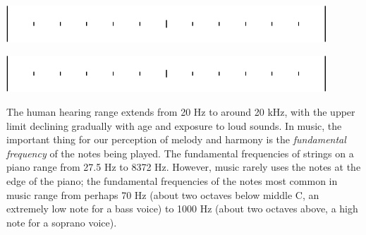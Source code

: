 \documentclass[12pt]{article}
\begin{document}
\vspace{0.5in}
\begin{minipage}{0.5\textwidth}
	\begin{center}
		\includegraphics[width=0.9\textwidth]{string-crop.pdf}
	\end{center}
\end{minipage}
\begin{minipage}{0.25\textwidth}
	\hspace{0.5in}
\end{minipage}
\begin{minipage}{0.25\textwidth}
	\begin{center}
		
	\end{center}	
\end{minipage}


\vspace{0.5in}
\begin{minipage}{0.5\textwidth}
	\begin{center}
		\includegraphics[width=0.9\textwidth]{string-crop.pdf}
	\end{center}
\end{minipage}
\begin{minipage}{0.25\textwidth}
	\hspace{0.5in}
\end{minipage}
\begin{minipage}{0.25\textwidth}
	\begin{center}
		
	\end{center}	
\end{minipage}

\newpage

The human hearing range extends from 20 Hz to around 20 kHz, with the upper limit declining gradually with age and exposure to loud sounds. In music, the important thing for our perception of melody and harmony is the {\it fundamental frequency} of the notes being played. The fundamental frequencies of strings on a piano range from 27.5 Hz to 8372 Hz. However, music rarely uses the notes at the edge of the piano; the fundamental frequencies of the notes most common in music range from perhaps 70 Hz (about two octaves below middle C, an extremely low note for a bass voice) to 1000 Hz (about two octaves above, a high note for a soprano voice).
\end{document}
